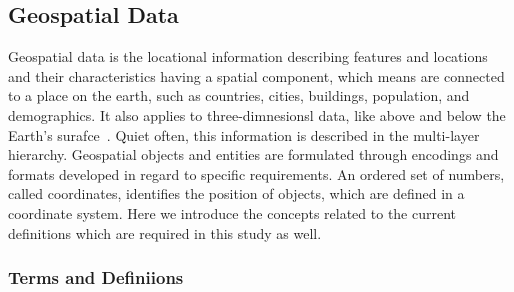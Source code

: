 \documentclass[a4paper,12pt]{article}
\begin{document}
\subsection{Geospatial Data}
Geospatial data is the locational information describing features and locations and their characteristics having a spatial component, which means are connected to a place on the earth, such as countries, cities, buildings, population, and demographics. It also applies to three-dimnesionsl data, like above and below the Earth's surafce~\cite{powell}. Quiet often, this information is described in the multi-layer hierarchy. Geospatial objects and entities are formulated through encodings and formats developed in regard to specific requirements. An ordered set of numbers, called coordinates, identifies the position of objects, which are defined in a coordinate system. Here we introduce the concepts related to the current definitions which are required in this study as well.

\subsubsection{Terms and Definiions}
\end{document}
